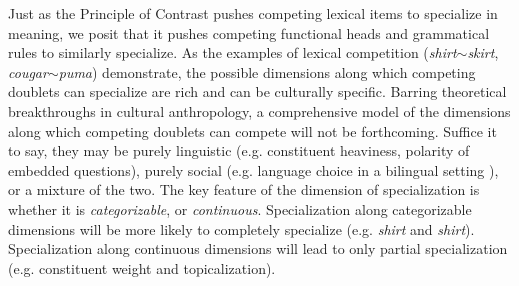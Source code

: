 Just as the Principle of Contrast pushes competing lexical items to specialize in meaning, we posit that it pushes competing functional heads and grammatical rules to similarly specialize.
As the examples of lexical competition (\textsl{shirt}$\sim$\textsl{skirt}, \textsl{cougar}$\sim$\textsl{puma}) demonstrate, the possible dimensions along which competing doublets can specialize are rich and can be culturally specific.
Barring theoretical breakthroughs in cultural anthropology, a comprehensive model of the dimensions along which competing doublets can compete will not be forthcoming.
Suffice it to say, they may be purely linguistic (e.g. constituent heaviness, polarity of embedded questions), purely social (e.g. language choice in a bilingual setting ), or a mixture of the two.
The key feature of the dimension of specialization is whether it is \emph{categorizable}, or \emph{continuous}.
Specialization along categorizable dimensions will be more likely to completely specialize (e.g. \textsl{shirt} and \textsl{shirt}).
Specialization along continuous dimensions will lead to only partial specialization (e.g. constituent weight and topicalization).


